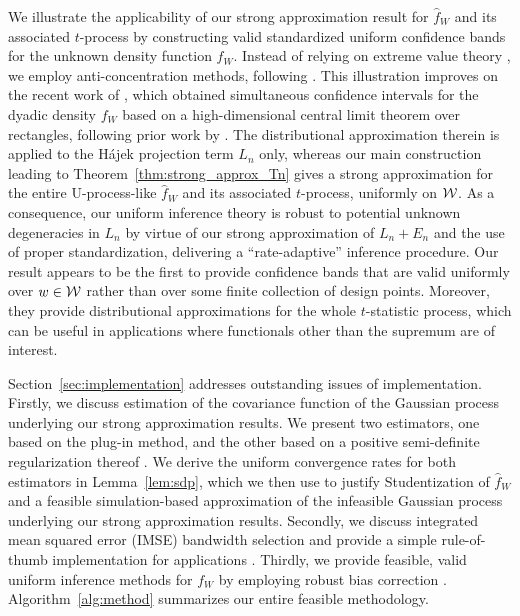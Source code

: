 We illustrate the applicability of our strong approximation result for
$\hat{f}_W$ and its associated $t$-process by constructing valid standardized
uniform confidence bands for the unknown density function $f_W$. Instead of
relying on extreme value theory \citep*[e.g.][]{gine2004kernel}, we employ
anti-concentration methods, following \citet{chernozhukov2014anti}. This
illustration improves on the recent work of \citet{chiang2022inference}, which
obtained simultaneous confidence intervals for the dyadic density $f_W$ based
on a high-dimensional central limit theorem over rectangles, following prior
work by \citet{chernozhukov2017central}. The distributional
approximation therein is applied to the H\'{a}jek projection term $L_n$ only,
whereas our main construction leading to Theorem~\ref{thm:strong_approx_Tn}
gives a strong approximation for the entire U-process-like $\hat{f}_W$ and its
associated $t$-process, uniformly on $\mathcal{W}$. As a consequence, our uniform
inference theory is robust to potential unknown degeneracies in $L_n$ by virtue
of our strong approximation of $L_n+E_n$ and the use of proper standardization,
delivering a ``rate-adaptive'' inference procedure. Our result appears to be
the first to provide confidence bands that are valid uniformly over $w \in \mathcal{W}$
rather than over some finite collection of design points. Moreover, they
provide distributional approximations for the whole $t$-statistic process,
which can be useful in applications where functionals other than the supremum
are of interest.

Section~\ref{sec:implementation} addresses outstanding issues of
implementation. Firstly, we discuss estimation of the covariance function of
the Gaussian process underlying our strong approximation results. We present
two estimators, one based on the plug-in method, and the other based on a
positive semi-definite regularization thereof \citep{laurent2005semidefinite}.
We derive the uniform convergence rates for both estimators in
Lemma~\ref{lem:sdp}, which we then use to justify Studentization of $\hat{f}_W$
and a feasible simulation-based approximation of the infeasible Gaussian
process underlying our strong approximation results. Secondly, we discuss
integrated mean squared error (IMSE) bandwidth selection and provide a simple
rule-of-thumb implementation for applications
\citep{wand1994kernel,simonoff2012smoothing}. Thirdly, we provide feasible,
valid uniform inference methods for $f_W$ by employing robust bias correction
\citep{calonico2018effect, calonico2022coverage}. Algorithm~\ref{alg:method}
summarizes our entire feasible methodology.

